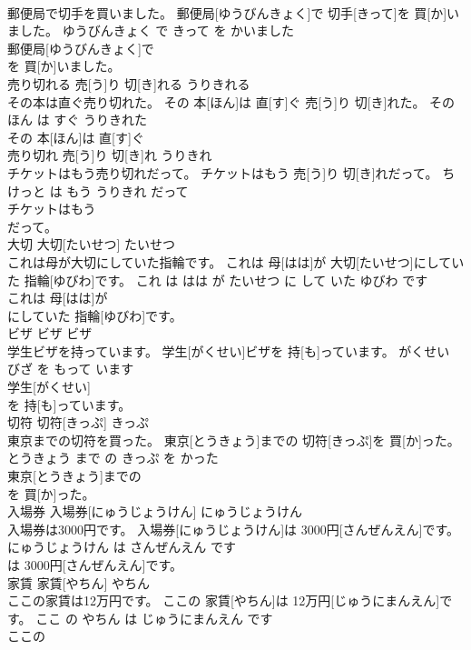 \documentclass[8pt]{extreport}
\begin{document}
\begin{CJK}{UTF8}{min}
\\	郵便局で切手を買いました。	郵便局[ゆうびんきょく]で 切手[きって]を 買[か]いました。	ゆうびんきょく で きって を かいました	
\\	郵便局[ゆうびんきょく]で
\\	を 買[か]いました。			
\\	売り切れる	売[う]り 切[き]れる	うりきれる	
\\	その本は直ぐ売り切れた。	その 本[ほん]は 直[す]ぐ 売[う]り 切[き]れた。	その ほん は すぐ うりきれた	
\\	その 本[ほん]は 直[す]ぐ
\\	売り切れ	売[う]り 切[き]れ	うりきれ	
\\	チケットはもう売り切れだって。	チケットはもう 売[う]り 切[き]れだって。	ちけっと は もう うりきれ だって	
\\	チケットはもう
\\	だって。			
\\	大切	大切[たいせつ]	たいせつ	
\\	これは母が大切にしていた指輪です。	これは 母[はは]が 大切[たいせつ]にしていた 指輪[ゆびわ]です。	これ は はは が たいせつ に して いた ゆびわ です	
\\	これは 母[はは]が
\\	にしていた 指輪[ゆびわ]です。			
\\	ビザ	ビザ	ビザ	
\\	学生ビザを持っています。	学生[がくせい]ビザを 持[も]っています。	がくせい びざ を もって います	
\\	学生[がくせい]
\\	を 持[も]っています。			
\\	切符	切符[きっぷ]	きっぷ	
\\	東京までの切符を買った。	東京[とうきょう]までの 切符[きっぷ]を 買[か]った。	とうきょう まで の きっぷ を かった	
\\	東京[とうきょう]までの
\\	を 買[か]った。			
\\	入場券	入場券[にゅうじょうけん]	にゅうじょうけん	
\\	入場券は3000円です。	入場券[にゅうじょうけん]は 3000円[さんぜんえん]です。	にゅうじょうけん は さんぜんえん です	
\\	は 3000円[さんぜんえん]です。			
\\	家賃	家賃[やちん]	やちん	
\\	ここの家賃は12万円です。	ここの 家賃[やちん]は 12万円[じゅうにまんえん]です。	ここ の やちん は じゅうにまんえん です	
\\	ここの

\end{CJK}
\end{document}
